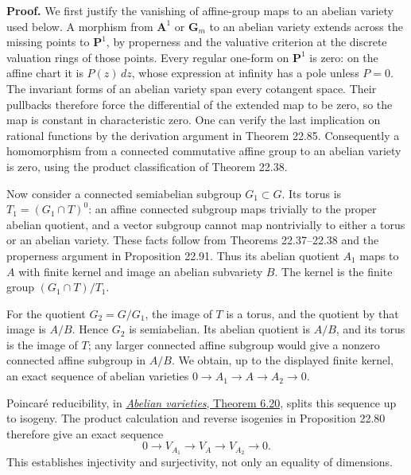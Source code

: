 \documentclass[
  11pt,
  a4paper,
]{article}
\begin{document}
\textbf{Proof.} We first justify the vanishing of affine-group maps to
an abelian variety used below. A morphism from \(\mathbf A^1\) or
\(\mathbf G_m\) to an abelian variety extends across the missing points
to \(\mathbf P^1\), by properness and the valuative criterion at the
discrete valuation rings of those points. Every regular one-form on
\(\mathbf P^1\) is zero: on the affine chart it is \(P(z)\,dz\), whose
expression at infinity has a pole unless \(P=0\). The invariant forms of
an abelian variety span every cotangent space. Their pullbacks therefore
force the differential of the extended map to be zero, so the map is
constant in characteristic zero. One can verify the last implication on
rational functions by the derivation argument in Theorem 22.85.
Consequently a homomorphism from a connected commutative affine group to
an abelian variety is zero, using the product classification of Theorem
22.38.

Now consider a connected semiabelian subgroup \(G_1\subset G\). Its
torus is \(T_1=(G_1\cap T)^0\): an affine connected subgroup maps
trivially to the proper abelian quotient, and a vector subgroup cannot
map nontrivially to either a torus or an abelian variety. These facts
follow from Theorems 22.37--22.38 and the properness argument in
Proposition 22.91. Thus its abelian quotient \(A_1\) maps to \(A\) with
finite kernel and image an abelian subvariety \(B\). The kernel is the
finite group \((G_1\cap T)/T_1\).

For the quotient \(G_2=G/G_1\), the image of \(T\) is a torus, and the
quotient by that image is \(A/B\). Hence \(G_2\) is semiabelian. Its
abelian quotient is \(A/B\), and its torus is the image of \(T\); any
larger connected affine subgroup would give a nonzero connected affine
subgroup in \(A/B\). We obtain, up to the displayed finite kernel, an
exact sequence of abelian varieties \(0\to A_1\to A\to A_2\to0\).

Poincaré reducibility, in
\href{https://github.com/KokunoYumeto/open-math-courses-public/blob/146dc81802e69cf262fb6cc65c1b9f74e71f4625/docs/courses/AG-GS/src/abelian-varieties.md\#the-representing-dual-and-its-universal-bundle}{\emph{Abelian
varieties}, Theorem 6.20}, splits this sequence up to isogeny. The
product calculation and reverse isogenies in Proposition 22.80 therefore
give an exact sequence \[
 0\longrightarrow V_{A_1}\longrightarrow V_A
       \longrightarrow V_{A_2}\longrightarrow0.
 \tag{22.231}
\] This establishes injectivity and surjectivity, not only an equality
of dimensions.
\end{document}

